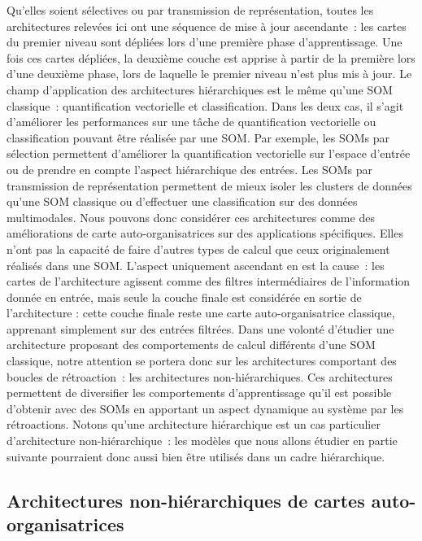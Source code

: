 \documentclass[../main]{subfiles}
\begin{document}
{Qu'elles soient sélectives ou par transmission de représentation, toutes les architectures relevées ici ont une séquence de mise à jour ascendante~: les cartes du premier niveau sont dépliées lors d'une première phase d'apprentissage. Une fois ces cartes dépliées, la deuxième couche est apprise à partir de la première lors d'une deuxième phase, lors de laquelle le premier niveau n'est plus mis à jour.
Le champ d'application des architectures hiérarchiques est le même qu'une SOM classique~: quantification vectorielle et classification.
Dans les deux cas, il s'agit d'améliorer les performances sur une tâche de quantification vectorielle ou classification pouvant être réalisée par une SOM. 
Par exemple, les SOMs par sélection permettent d'améliorer la quantification vectorielle sur l'espace d'entrée ou de prendre en compte l'aspect hiérarchique des entrées. Les SOMs par transmission de représentation permettent de mieux isoler les clusters de données qu'une SOM classique ou d'effectuer une classification sur des données multimodales.
Nous pouvons donc considérer ces architectures comme des améliorations de carte auto-organisatrices sur des applications spécifiques.
Elles n'ont pas la capacité de faire d'autres types de calcul que ceux originalement réalisés dans une SOM.
L'aspect uniquement ascendant en est la cause~: les cartes de l'architecture agissent comme des filtres intermédiaires de l'information donnée en entrée, mais seule la couche finale est considérée en sortie de l'architecture : cette couche finale reste une carte auto-organisatrice classique, apprenant simplement sur des entrées filtrées.
Dans une volonté d'étudier une architecture proposant des comportements de calcul différents d'une SOM classique, notre attention se portera donc sur les architectures comportant des boucles de rétroaction~: les architectures non-hiérarchiques.
Ces architectures permettent de diversifier les comportements d'apprentissage qu'il est possible d'obtenir avec des SOMs en apportant un aspect dynamique au système par les rétroactions. 
Notons qu'une architecture hiérarchique est un cas particulier d'architecture non-hiérarchique~: les modèles que nous allons étudier en partie suivante pourraient donc aussi bien être utilisés dans un cadre hiérarchique.


\subsection{Architectures non-hiérarchiques de cartes auto-organisatrices}

}
\end{document}
